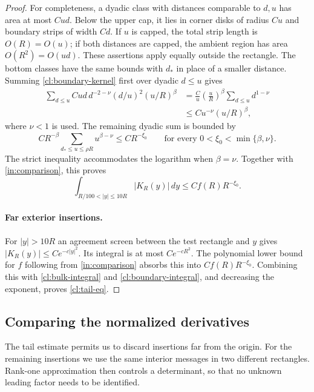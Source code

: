 \begin{proof}
For completeness, a dyadic class with distances comparable to
$d,u$ has area at most $Cud$. Below the upper cap, it lies in
corner disks of radius $Cu$ and boundary strips of width $Cd$.
If $u$ is capped, the total strip length is $O(R)=O(u)$;
if both distances are capped, the ambient region has area
$O(R^2)=O(ud)$. These assertions apply equally outside the
rectangle. The bottom classes have the same bounds with $d_*$
in place of a smaller distance. Summing
\eqref{cl:boundary-kernel} first over dyadic $d\le u$ gives
\begin{align*}
 \sum_{d\le u} Cud\,d^{-2-\nu}(d/u)^2(u/R)^\beta
 &=\frac C u\left(\frac uR\right)^\beta
                           \sum_{d\le u}d^{1-\nu}\\
 &\le C u^{-\nu}(u/R)^\beta,
\end{align*}
where $\nu<1$ is used. The remaining dyadic sum is bounded by
\[
 C R^{-\beta}\sum_{d_*\le u\le\rho R}u^{\beta-\nu}
 \le C R^{-\xi_0}
 \qquad\text{for every }0<\xi_0<\min\{\beta,\nu\}.
\]
The strict inequality accommodates the logarithm when $\beta=\nu$.
Together with \eqref{in:comparison}, this proves
\begin{equation}\label{cl:boundary-integral}
 \int_{R/100<|y|\le10R}|K_R(y)|\,dy
 \le C f(R)R^{-\xi_0}.
\end{equation}

\paragraph{Far exterior insertions.}
For $|y|>10R$ an agreement screen between the test rectangle and
$y$ gives $|K_R(y)|\le Ce^{-c|y|^2}$. Its integral is at most
$Ce^{-cR^2}$. The polynomial lower bound for $f$ following from
\eqref{in:comparison} absorbs this into $Cf(R)R^{-\xi_0}$.
Combining this with \eqref{cl:bulk-integral} and
\eqref{cl:boundary-integral}, and decreasing the exponent, proves
\eqref{cl:tail-eq}.
\end{proof}

\subsection{Comparing the normalized derivatives}

The tail estimate permits us to discard insertions far from the
origin. For the remaining insertions we use the same interior
messages in two different rectangles. Rank-one approximation then
controls a determinant, so that no unknown leading factor needs
to be identified.

